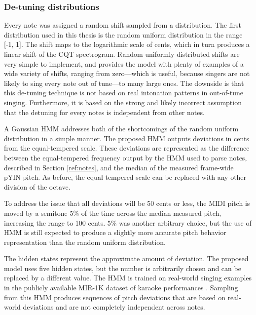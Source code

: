 \subsubsection{De-tuning distributions}
Every note was assigned a random shift sampled from a distribution. The first distribution used in this thesis is the random uniform distribution in the range [-1, 1]. The shift maps to the logarithmic scale of cents, which in turn produces a linear shift of the CQT spectrogram. Random uniformly distributed shifts are very simple to implement, and provides the model with plenty of examples of a wide variety of shifts, ranging from zero---which is useful, because singers are not likely to sing every note out of tune---to many large ones. The downside is that this de-tuning technique is not based on real intonation patterns in out-of-tune singing. Furthermore, it is based on the strong and likely incorrect assumption that the detuning for every notes is independent from other notes.

A Gaussian HMM addresses both of the shortcomings of the random uniform distribution in a simple manner. The proposed HMM outputs deviations in cents from the equal-tempered scale. These deviations are represented as the difference between the equal-tempered frequency output by the HMM used to parse notes, described in Section \ref{ref:notes}, and the median of the measured frame-wide pYIN pitch. As before, the equal-tempered scale can be replaced with any other division of the octave. 

To address the issue that all deviations will be 50 cents or less, the MIDI pitch is moved by a semitone 5\% of the time across the median measured pitch, increasing the range to 100 cents. 5\% was another arbitrary choice, but the use of HMM is still expected to produce a slightly more accurate pitch behavior representation than the random uniform distribution.

The hidden states represent the approximate amount of deviation. The proposed model uses five hidden states, but the number is arbitrarily chosen and can be replaced by a different value. The HMM is trained on real-world singing examples in the publicly available MIR-1K dataset of karaoke performances \cite{su2009improvement}. Sampling from this HMM produces sequences of pitch deviations that are based on real-world deviations and are not completely independent across notes.


